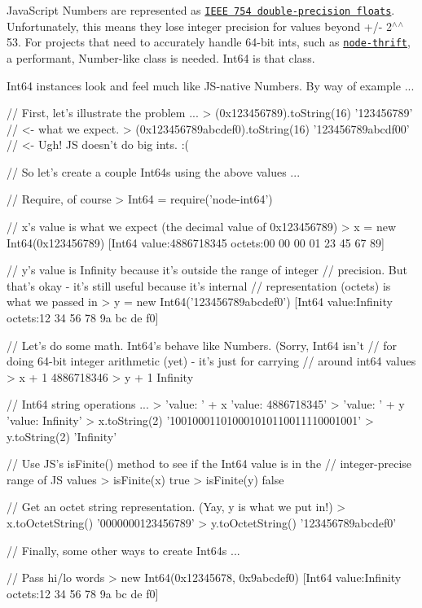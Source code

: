 Java\+Script Numbers are represented as \href{http://steve.hollasch.net/cgindex/coding/ieeefloat.html}{\tt I\+E\+EE 754 double-\/precision floats}. Unfortunately, this means they lose integer precision for values beyond +/-\/ 2$^\wedge$$^\wedge$53. For projects that need to accurately handle 64-\/bit ints, such as \href{https://github.com/wadey/node-thrift}{\tt node-\/thrift}, a performant, Number-\/like class is needed. Int64 is that class.

Int64 instances look and feel much like J\+S-\/native Numbers. By way of example ... 
\begin{DoxyCode}
// First, let's illustrate the problem ...
> (0x123456789).toString(16)
'123456789' // <- what we expect.
> (0x123456789abcdef0).toString(16)
'123456789abcdf00' // <- Ugh!  JS doesn't do big ints. :(

// So let's create a couple Int64s using the above values ...

// Require, of course
> Int64 = require('node-int64')

// x's value is what we expect (the decimal value of 0x123456789)
> x = new Int64(0x123456789)
[Int64 value:4886718345 octets:00 00 00 01 23 45 67 89]

// y's value is Infinity because it's outside the range of integer
// precision.  But that's okay - it's still useful because it's internal
// representation (octets) is what we passed in
> y = new Int64('123456789abcdef0')
[Int64 value:Infinity octets:12 34 56 78 9a bc de f0]

// Let's do some math.  Int64's behave like Numbers.  (Sorry, Int64 isn't
// for doing 64-bit integer arithmetic (yet) - it's just for carrying
// around int64 values
> x + 1
4886718346
> y + 1
Infinity

// Int64 string operations ...
> 'value: ' + x
'value: 4886718345'
> 'value: ' + y
'value: Infinity'
> x.toString(2)
'100100011010001010110011110001001'
> y.toString(2)
'Infinity'

// Use JS's isFinite() method to see if the Int64 value is in the
// integer-precise range of JS values
> isFinite(x)
true
> isFinite(y)
false

// Get an octet string representation.  (Yay, y is what we put in!)
> x.toOctetString()
'0000000123456789'
> y.toOctetString()
'123456789abcdef0'

// Finally, some other ways to create Int64s ...

// Pass hi/lo words
> new Int64(0x12345678, 0x9abcdef0)
[Int64 value:Infinity octets:12 34 56 78 9a bc de f0]


\end{DoxyCode}
